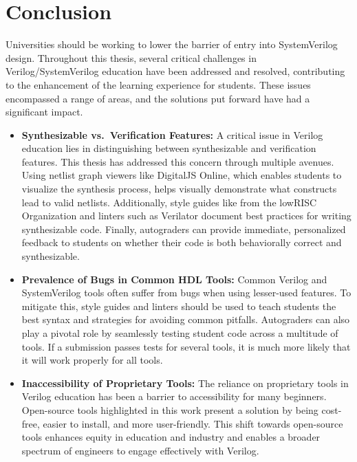 
\chapter{Conclusion}
\label{chapter:conclusion}

Universities should be working to lower the barrier of entry into SystemVerilog design.
Throughout this thesis, several critical challenges in Verilog/SystemVerilog education have been addressed and resolved, contributing to the enhancement of the learning experience for students.
These issues encompassed a range of areas, and the solutions put forward have had a significant impact.

\begin{itemize}
    \item \textbf{Synthesizable vs.\ Verification Features:}
        A critical issue in Verilog education lies in distinguishing between synthesizable and verification features.
        This thesis has addressed this concern through multiple avenues.
        Using netlist graph viewers like DigitalJS Online, which enables students to visualize the synthesis process, helps visually demonstrate what constructs lead to valid netlists.
        Additionally, style guides like from the lowRISC Organization and linters such as Verilator document best practices for writing synthesizable code.
        Finally, autograders can provide immediate, personalized feedback to students on whether their code is both behaviorally correct and synthesizable.
    \item \textbf{Prevalence of Bugs in Common HDL Tools:}
        Common Verilog and SystemVerilog tools often suffer from bugs when using lesser-used features.
        To mitigate this, style guides and linters should be used to teach students the best syntax and strategies for avoiding common pitfalls.
        Autograders can also play a pivotal role by seamlessly testing student code across a multitude of tools.
        If a submission passes tests for several tools, it is much more likely that it will work properly for all tools.
    \item \textbf{Inaccessibility of Proprietary Tools:}
        The reliance on proprietary tools in Verilog education has been a barrier to accessibility for many beginners.
        Open-source tools highlighted in this work present a solution by being cost-free, easier to install, and more user-friendly.
        This shift towards open-source tools enhances equity in education and industry and enables a broader spectrum of engineers to engage effectively with Verilog.

\end{itemize}
